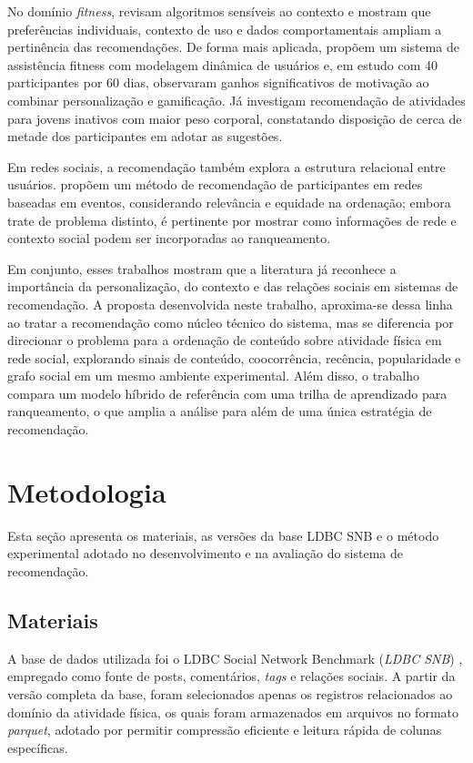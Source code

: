 \documentclass[a4paper,12pt]{article}
\begin{document}
No domínio \textit{fitness},  revisam algoritmos sensíveis ao contexto e mostram que preferências individuais, contexto de uso e dados comportamentais ampliam a pertinência das recomendações. De forma mais aplicada,  propõem um sistema de assistência fitness com modelagem dinâmica de usuários e, em estudo com 40 participantes por 60 dias, observaram ganhos significativos de motivação ao combinar personalização e gamificação. Já  investigam recomendação de atividades para jovens inativos com maior peso corporal, constatando disposição de cerca de metade dos participantes em adotar as sugestões.

Em redes sociais, a recomendação também explora a estrutura relacional entre usuários.  propõem um método de recomendação de participantes em redes baseadas em eventos, considerando relevância e equidade na ordenação; embora trate de problema distinto, é pertinente por mostrar como informações de rede e contexto social podem ser incorporadas ao ranqueamento.

Em conjunto, esses trabalhos mostram que a literatura já reconhece a importância da personalização, do contexto e das relações sociais em sistemas de recomendação. A proposta desenvolvida neste trabalho, aproxima-se dessa linha ao tratar a recomendação como núcleo técnico do sistema, mas se diferencia por direcionar o problema para a ordenação de conteúdo sobre atividade física em rede social, explorando sinais de conteúdo, coocorrência, recência, popularidade e grafo social em um mesmo ambiente experimental. Além disso, o trabalho compara um modelo híbrido de referência com uma trilha de aprendizado para ranqueamento, o que amplia a análise para além de uma única estratégia de recomendação.




\section{Metodologia}

Esta seção apresenta os materiais, as versões da base LDBC SNB e o método experimental adotado no desenvolvimento e na avaliação do sistema de recomendação.

\subsection{Materiais}

A base de dados utilizada foi o LDBC Social Network Benchmark (\textit{LDBC SNB}) \cite{Angles2020LDBCSNB}, empregado como fonte de posts, comentários, \textit{tags} e relações sociais. A partir da versão completa da base, foram selecionados apenas os registros relacionados ao domínio da atividade física, os quais foram armazenados em arquivos no formato \textit{parquet}, adotado por permitir compressão eficiente e leitura rápida de colunas específicas.
\end{document}
